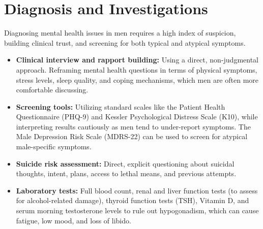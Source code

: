\section*{Diagnosis and Investigations}
Diagnosing mental health issues in men requires a high index of suspicion, building clinical trust, and screening for both typical and atypical symptoms.
\begin{itemize}
    \item \textbf{Clinical interview and rapport building:} Using a direct, non-judgmental approach. Reframing mental health questions in terms of physical symptoms, stress levels, sleep quality, and coping mechanisms, which men are often more comfortable discussing.
    \item \textbf{Screening tools:} Utilizing standard scales like the Patient Health Questionnaire (PHQ-9) and Kessler Psychological Distress Scale (K10), while interpreting results cautiously as men tend to under-report symptoms. The Male Depression Risk Scale (MDRS-22) can be used to screen for atypical male-specific symptoms.
    \item \textbf{Suicide risk assessment:} Direct, explicit questioning about suicidal thoughts, intent, plans, access to lethal means, and previous attempts.
    \item \textbf{Laboratory tests:} Full blood count, renal and liver function tests (to assess for alcohol-related damage), thyroid function tests (TSH), Vitamin D, and serum morning testosterone levels to rule out hypogonadism, which can cause fatigue, low mood, and loss of libido.
\end{itemize}

